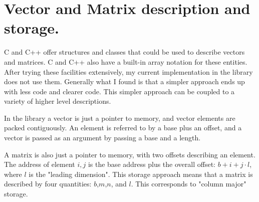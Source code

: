 \documentclass{article}
\begin{document}
\section{Vector and Matrix description and storage.}

  C and C++ offer structures and classes that could be used
to describe vectors and matrices. C and C++ also have
a built-in array notation for these entities. After
trying these facilities extensively, my current implementation
in the library does not use them. Generally what I found is
that a simpler approach ends up with less code and clearer
code. This simpler approach can be coupled to a variety of
higher level descriptions.

  In the library a vector is just a pointer to memory, and
vector elements are packed contiguously. An element is
referred to by a base plus an offset, and a vector is passed
as an argument by passing a base and a length. 

  A matrix is also just a pointer to memory, with two offsets
describing an element. The address of element $i, j$ is the
base address plus the overall offset: $ b + i + j\cdot l$, where $l$ is
the "leading dimension". This storage approach means that a
matrix is described by four quantities: $b$,$m$,$n$, and $l$.
This corresponds to "column major" storage.
\end{document}
